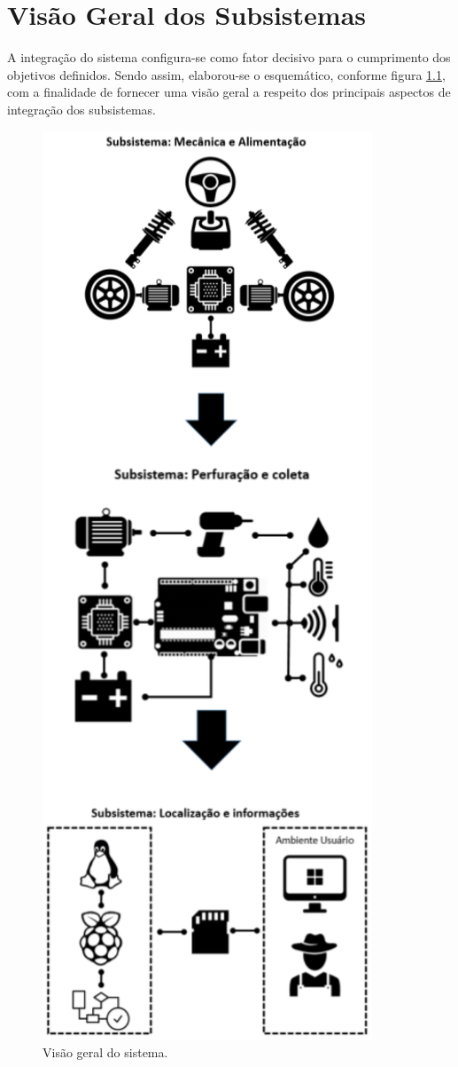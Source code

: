 \chapter{Visão Geral dos Subsistemas}

A integração do sistema configura-se como fator decisivo para o cumprimento dos objetivos definidos.
Sendo assim, elaborou-se o esquemático, conforme figura \ref{fig:visao_geral}, com a finalidade de fornecer uma visão geral a
respeito dos principais aspectos de integração dos subsistemas.

\begin{figure}[!htbp]
\begin{center}
\includegraphics[width=.6\textwidth]{figuras/all_systems.eps}
\caption{\label{fig:visao_geral}Visão geral do sistema.}
\end{center}
\end{figure}

